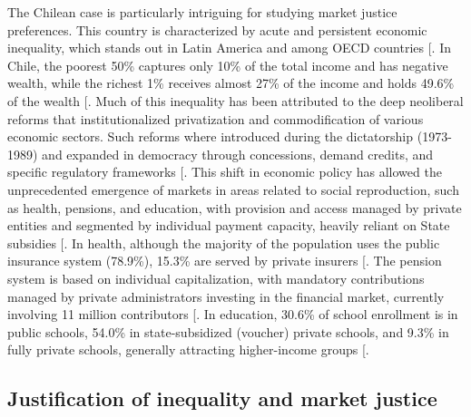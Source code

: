 \documentclass[
  12pt,
  letterpaper,
]{article}
\begin{document}
The Chilean case is particularly intriguing for studying market justice
preferences. This country is characterized by acute and persistent
economic inequality, which stands out in Latin America and among OECD
countries {[}\citeproc{ref-flores_top_2020}{12}{]}. In Chile, the
poorest 50\% captures only 10\% of the total income and has negative
wealth, while the richest 1\% receives almost 27\% of the income and
holds 49.6\% of the wealth {[}\citeproc{ref-chancel_world_2022}{13}{]}.
Much of this inequality has been attributed to the deep neoliberal
reforms that institutionalized privatization and commodification of
various economic sectors. Such reforms where introduced during the
dictatorship (1973-1989) and expanded in democracy through concessions,
demand credits, and specific regulatory frameworks
{[}\citeproc{ref-ffrench-davis_reformas_2018}{14}{]}. This shift in
economic policy has allowed the unprecedented emergence of markets in
areas related to social reproduction, such as health, pensions, and
education, with provision and access managed by private entities and
segmented by individual payment capacity, heavily reliant on State
subsidies {[}\citeproc{ref-boccardo_30_2020}{15}{]}. In health, although
the majority of the population uses the public insurance system
(78.9\%), 15.3\% are served by private insurers
{[}\citeproc{ref-observatoriosocial_estadisticas_2024}{16}{]}. The
pension system is based on individual capitalization, with mandatory
contributions managed by private administrators investing in the
financial market, currently involving 11 million contributors
{[}\citeproc{ref-superintendenciadepensiones_estadisticas_2024}{17}{]}.
In education, 30.6\% of school enrollment is in public schools, 54.0\%
in state-subsidized (voucher) private schools, and 9.3\% in fully
private schools, generally attracting higher-income groups
{[}\citeproc{ref-ministeriodeeducacion_resumen_2023}{18}{]}.

\subsection{Justification of inequality and market
justice}\label{justification-of-inequality-and-market-justice}
\end{document}
